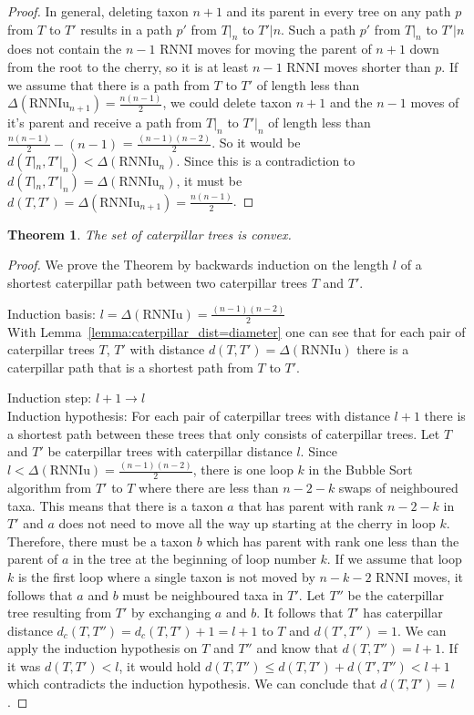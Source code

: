 \documentclass[11pt, a4paper]{article}
\newcommand{\rnni}{\mathrm{RNNI}}
\newcommand{\rnniu}{\mathrm{RNNIu}}
\newtheorem{theorem}[definition]{Theorem}
\begin{document}
\begin{proof}
    In general, deleting taxon $n+1$ and its parent in every tree on any path $p$ from $T$ to $T'$ results in a path $p'$ from $T|_n$ to $T'|n$.
    Such a path $p'$ from $T|_n$ to $T'|n$ does not contain the $n-1$ $\rnni$ moves for moving the parent of $n+1$ down from the root to the cherry, so it is at least $n-1$ $\rnni$ moves shorter than $p$.
    If we assume that there is a path from $T$ to $T'$ of length less than $\Delta(\rnniu_{n+1}) = \frac{n(n-1)}{2}$, we could delete taxon $n+1$ and the $n-1$ moves of it's parent and receive a path from $T|_n$ to $T'|_n$ of length less than $\frac{n(n-1)}{2} - (n-1)$ = $\frac{(n-1)(n-2)}{2}$.
    So it would be $d(T|_n, T'|_n) < \Delta(\rnniu_n)$.
    Since this is a contradiction to $d(T|_n, T'|_n) = \Delta(\rnniu_n)$, it must be $d(T,T') = \Delta(\rnniu_{n+1}) = \frac{n(n-1)}{2} $.

\end{proof}

\begin{theorem}
    The set of caterpillar trees is convex.
\end{theorem}

\begin{proof}
    We prove the Theorem by backwards induction on the length $l$ of a shortest caterpillar path between two caterpillar trees $T$ and $T'$.

    Induction basis: $l = \Delta(\rnniu) = \frac{(n-1)(n-2)}{2}$\\
    With Lemma~\ref{lemma:caterpillar_dist=diameter} one can see that for each pair of caterpillar trees $T$, $T'$ with distance $d(T,T') = \Delta(\rnniu)$ there is a caterpillar path that is a shortest path from $T$ to $T'$.

    Induction step: $l+1 \to l$\\
    Induction hypothesis: For each pair of caterpillar trees with distance $l+1$ there is a shortest path between these trees that only consists of caterpillar trees.
    Let $T$ and $T'$ be caterpillar trees with caterpillar distance $l$.
    Since $l < \Delta(\rnniu) = \frac{(n-1)(n-2)}{2}$, there is one loop $k$ in the Bubble Sort algorithm from $T'$ to $T$ where there are less than $n-2-k$ swaps of neighboured taxa.
    This means that there is a taxon $a$ that has parent with rank $n-2-k$ in $T'$ and $a$ does not need to move all the way up starting at the cherry in loop $k$.
    Therefore, there must be a taxon $b$ which has parent with rank one less than the parent of $a$ in the tree at the beginning of loop number $k$.
    If we assume that loop $k$ is the first loop where a single taxon is not moved by $n-k-2$ $\rnni$ moves, it follows that $a$ and $b$ must be neighboured taxa in $T'$.
    Let $T''$ be the caterpillar tree resulting from $T'$ by exchanging $a$ and $b$.
    It follows that $T'$ has caterpillar distance $d_c(T,T'') = d_c(T,T') + 1 = l+1$ to $T$ and $d(T',T'') = 1$.
    We can apply the induction hypothesis on $T$ and $T''$ and know that $d(T,T'') = l+1$.
    If it was $d(T,T') < l$, it would hold $d(T,T'') \leq d(T,T') + d(T',T'') < l + 1$ which contradicts the induction hypothesis.
    We can conclude that $d(T,T') = l$.

\end{proof}
\end{document}
